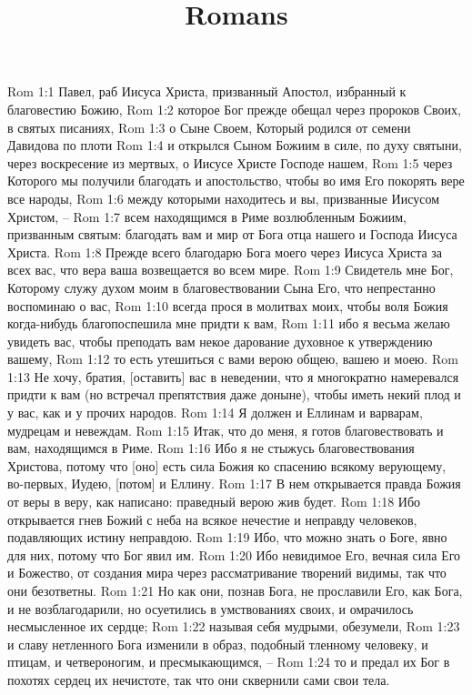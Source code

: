 

\title{Romans}

Rom 1:1  Павел, раб Иисуса Христа, призванный Апостол, избранный к благовестию Божию,
Rom 1:2  которое Бог прежде обещал через пророков Своих, в святых писаниях,
Rom 1:3  о Сыне Своем, Который родился от семени Давидова по плоти
Rom 1:4  и открылся Сыном Божиим в силе, по духу святыни, через воскресение из мертвых, о Иисусе Христе Господе нашем,
Rom 1:5  через Которого мы получили благодать и апостольство, чтобы во имя Его покорять вере все народы,
Rom 1:6  между которыми находитесь и вы, призванные Иисусом Христом, --
Rom 1:7  всем находящимся в Риме возлюбленным Божиим, призванным святым: благодать вам и мир от Бога отца нашего и Господа Иисуса Христа.
Rom 1:8  Прежде всего благодарю Бога моего через Иисуса Христа за всех вас, что вера ваша возвещается во всем мире.
Rom 1:9  Свидетель мне Бог, Которому служу духом моим в благовествовании Сына Его, что непрестанно воспоминаю о вас,
Rom 1:10  всегда прося в молитвах моих, чтобы воля Божия когда-нибудь благопоспешила мне придти к вам,
Rom 1:11  ибо я весьма желаю увидеть вас, чтобы преподать вам некое дарование духовное к утверждению вашему,
Rom 1:12  то есть утешиться с вами верою общею, вашею и моею.
Rom 1:13  Не хочу, братия, [оставить] вас в неведении, что я многократно намеревался придти к вам (но встречал препятствия даже доныне), чтобы иметь некий плод и у вас, как и у прочих народов.
Rom 1:14  Я должен и Еллинам и варварам, мудрецам и невеждам.
Rom 1:15  Итак, что до меня, я готов благовествовать и вам, находящимся в Риме.
Rom 1:16  Ибо я не стыжусь благовествования Христова, потому что [оно] есть сила Божия ко спасению всякому верующему, во-первых, Иудею, [потом] и Еллину.
Rom 1:17  В нем открывается правда Божия от веры в веру, как написано: праведный верою жив будет.
Rom 1:18  Ибо открывается гнев Божий с неба на всякое нечестие и неправду человеков, подавляющих истину неправдою.
Rom 1:19  Ибо, что можно знать о Боге, явно для них, потому что Бог явил им.
Rom 1:20  Ибо невидимое Его, вечная сила Его и Божество, от создания мира через рассматривание творений видимы, так что они безответны.
Rom 1:21  Но как они, познав Бога, не прославили Его, как Бога, и не возблагодарили, но осуетились в умствованиях своих, и омрачилось несмысленное их сердце;
Rom 1:22  называя себя мудрыми, обезумели,
Rom 1:23  и славу нетленного Бога изменили в образ, подобный тленному человеку, и птицам, и четвероногим, и пресмыкающимся, --
Rom 1:24  то и предал их Бог в похотях сердец их нечистоте, так что они сквернили сами свои тела.
